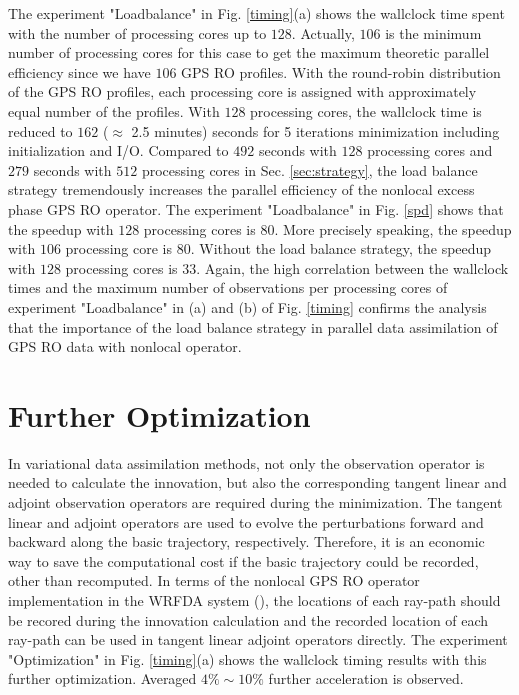 \documentclass[12pt]{article}
\begin{document}
The experiment "Loadbalance" in Fig. \ref{timing}(a) shows the wallclock time spent with the number of processing cores up to $128$. Actually, $106$ is the minimum number of processing cores for this case to get the maximum theoretic parallel efficiency since we have $106$ GPS RO profiles.  With the round-robin distribution of the GPS RO profiles, each processing core is assigned with approximately equal number of the profiles. With $128$ processing cores, the wallclock time is reduced to $162$ ($\approx$ 2.5 minutes) seconds for 5 iterations minimization including initialization and I/O. Compared to $492$ seconds with $128$ processing cores and $279$ seconds with $512$ processing cores in Sec. \ref{sec:strategy}, the load balance strategy tremendously increases the parallel efficiency of the nonlocal excess phase GPS RO operator. The experiment "Loadbalance" in Fig. \ref{spd} shows that the speedup with $128$ processing cores is $80$. More precisely speaking, the speedup with $106$ processing core is $80$. Without the load balance strategy, the speedup with $128$ processing cores is $33$. Again, the high correlation between the wallclock times and the maximum number of observations per processing cores of experiment "Loadbalance" in (a) and (b) of Fig. \ref{timing} confirms the analysis that the importance of the load balance strategy in parallel data assimilation of GPS RO data with nonlocal operator.

\section{Further Optimization}
\label{sec:opt}
In variational data assimilation methods, not only the observation operator is needed to calculate the innovation, but also the corresponding tangent linear and adjoint observation operators are required during the minimization. The tangent linear and adjoint operators are used to evolve the perturbations forward and backward along the basic trajectory, respectively. Therefore, it is an economic way to save the computational cost if the basic trajectory could be recorded, other than recomputed. In terms of the nonlocal GPS RO operator implementation in the WRFDA system (\cite{ChenSY2009}), the locations of each ray-path should be recored during the innovation calculation and the recorded location of each ray-path can be used in tangent linear adjoint operators directly. The experiment "Optimization" in Fig. \ref{timing}(a) shows the wallclock timing results with this further optimization. Averaged $4\% \sim 10\%$ further acceleration is observed.
\end{document}
